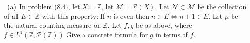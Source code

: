 \documentclass[11pt]{amsart}
\theoremstyle{definition}
\numberwithin{theorem}{section}
\numberwithin{definition}{section}
\numberwithin{equation}{section}
\def\integers{{\mathbb Z}}
\def\scriptm{{\mathcal M}}
\def\scriptn{{\mathcal N}}
\def\scriptp{{\mathcal P}}
\begin{document}
\newpage
\begin{figure}[h]
    \vspace*{-2cm}
\end{figure}




\medskip {}\ 
(a)\ In problem (8.4), let $X=\integers$, let
$\scriptm=\scriptp(X)$.
Let $\scriptn\subset\scriptm$ be the collection of all
$E\subset\integers$ with this property: If $n$ is even
then $n\in E\Leftrightarrow n+1\in E$. 
Let $\mu$ be the natural counting measure on $\integers$.
Let $f,g$ be as above, where $f\in L^1(\integers,\scriptp(\integers))$
Give a concrete formula for $g$ in terms of $f$.\\
\end{document}
